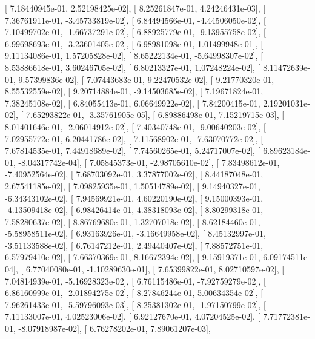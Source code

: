 \documentclass{article}
\begin{document}
       [  7.18440945e-01,   2.52198425e-02],
       [  8.25261847e-01,   4.24246431e-03],
       [  7.36761911e-01,  -3.45733819e-02],
       [  6.84494566e-01,  -4.44506050e-02],
       [  7.10499702e-01,  -1.66737291e-02],
       [  6.88925779e-01,  -9.13955758e-02],
       [  6.99698693e-01,  -3.23601405e-02],
       [  6.98981098e-01,   1.01499948e-01],
       [  9.11134086e-01,   1.57205828e-02],
       [  8.65222134e-01,  -5.64998307e-02],
       [  8.53886618e-01,   3.60246705e-02],
       [  6.80213327e-01,   1.07248224e-02],
       [  8.11472639e-01,   9.57399836e-02],
       [  7.07443683e-01,   9.22470532e-02],
       [  9.21770320e-01,   8.55532559e-02],
       [  9.20714884e-01,  -9.14503685e-02],
       [  7.19671824e-01,   7.38245108e-02],
       [  6.84055413e-01,   6.06649922e-02],
       [  7.84200415e-01,   2.19201031e-02],
       [  7.65293822e-01,  -3.35761905e-05],
       [  6.89886498e-01,   7.15219715e-03],
       [  8.01401646e-01,  -2.06014912e-02],
       [  7.40340748e-01,  -9.00640203e-02],
       [  7.02955772e-01,   6.20441786e-02],
       [  7.11568902e-01,  -7.63070772e-02],
       [  7.67814535e-01,   7.44918689e-02],
       [  7.74560265e-01,   5.24717007e-02],
       [  6.89623184e-01,  -8.04317742e-04],
       [  7.05845373e-01,  -2.98705610e-02],
       [  7.83498612e-01,  -7.40952564e-02],
       [  7.68703092e-01,   3.37877002e-02],
       [  8.44187048e-01,   2.67541185e-02],
       [  7.09825935e-01,   1.50514789e-02],
       [  9.14940327e-01,  -6.34343102e-02],
       [  7.94569921e-01,   4.60220190e-02],
       [  9.15000393e-01,  -4.13509418e-02],
       [  6.98426414e-01,   4.38318093e-02],
       [  8.80299318e-01,   7.58280637e-02],
       [  8.86769680e-01,   1.32707018e-02],
       [  8.62184460e-01,  -5.58958511e-02],
       [  6.93163926e-01,  -3.16649958e-02],
       [  8.45132997e-01,  -3.51133588e-02],
       [  6.76147212e-01,   2.49440407e-02],
       [  7.88572751e-01,   6.57979410e-02],
       [  7.66370369e-01,   8.16672394e-02],
       [  9.15919371e-01,   6.09174511e-04],
       [  6.77040080e-01,  -1.10289630e-01],
       [  7.65399822e-01,   8.02710597e-02],
       [  7.04814939e-01,  -5.16928323e-02],
       [  6.76115486e-01,  -7.92759279e-02],
       [  6.86160999e-01,  -2.01894275e-02],
       [  8.27846244e-01,   5.00634354e-02],
       [  7.96261433e-01,  -5.59796093e-03],
       [  8.25381302e-01,  -1.97150799e-02],
       [  7.11133007e-01,   4.02523006e-02],
       [  6.92127670e-01,   4.07204525e-02],
       [  7.71772381e-01,  -8.07918987e-02],
       [  6.76278202e-01,   7.89061207e-03],
\end{document}
